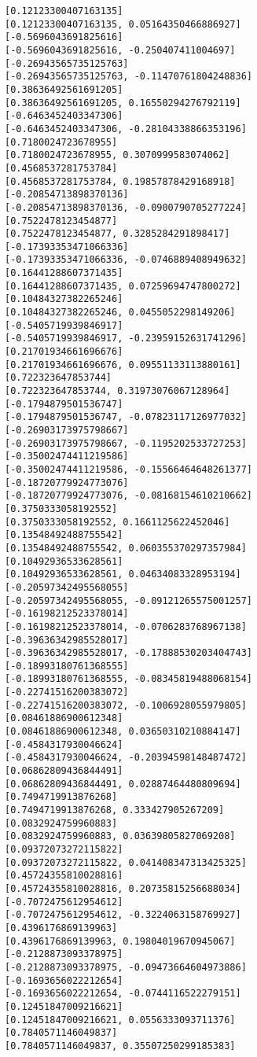 \documentclass[11pt]{article}
\begin{document}
\begin{Verbatim}[commandchars=\\\{\}]
[0.12123300407163135]
[0.12123300407163135, 0.05164350466886927]
[-0.5696043691825616]
[-0.5696043691825616, -0.250407411004697]
[-0.26943565735125763]
[-0.26943565735125763, -0.11470761804248836]
[0.38636492561691205]
[0.38636492561691205, 0.16550294276792119]
[-0.6463452403347306]
[-0.6463452403347306, -0.28104338866353196]
[0.7180024723678955]
[0.7180024723678955, 0.3070999583074062]
[0.4568537281753784]
[0.4568537281753784, 0.19857878429168918]
[-0.20854713898370136]
[-0.20854713898370136, -0.0900790705277224]
[0.7522478123454877]
[0.7522478123454877, 0.3285284291898417]
[-0.17393353471066336]
[-0.17393353471066336, -0.0746889408949632]
[0.16441288607371435]
[0.16441288607371435, 0.07259694747800272]
[0.10484327382265246]
[0.10484327382265246, 0.0455052298149206]
[-0.5405719939846917]
[-0.5405719939846917, -0.23959152631741296]
[0.21701934661696676]
[0.21701934661696676, 0.09551133113880161]
[0.722323647853744]
[0.722323647853744, 0.31973076067128964]
[-0.1794879501536747]
[-0.1794879501536747, -0.07823117126977032]
[-0.26903173975798667]
[-0.26903173975798667, -0.1195202533727253]
[-0.35002474411219586]
[-0.35002474411219586, -0.15566464648261377]
[-0.18720779924773076]
[-0.18720779924773076, -0.08168154610210662]
[0.3750333058192552]
[0.3750333058192552, 0.1661125622452046]
[0.13548492488755542]
[0.13548492488755542, 0.060355370297357984]
[0.10492936533628561]
[0.10492936533628561, 0.04634083328953194]
[-0.20597342495568055]
[-0.20597342495568055, -0.09121265575001257]
[-0.16198212523378014]
[-0.16198212523378014, -0.0706283768967138]
[-0.39636342985528017]
[-0.39636342985528017, -0.17888530203404743]
[-0.18993180761368555]
[-0.18993180761368555, -0.08345819488068154]
[-0.22741516200383072]
[-0.22741516200383072, -0.1006928055979805]
[0.08461886900612348]
[0.08461886900612348, 0.03650310210884147]
[-0.4584317930046624]
[-0.4584317930046624, -0.20394598148487472]
[0.06862809436844491]
[0.06862809436844491, 0.02887464480809694]
[0.7494719913876268]
[0.7494719913876268, 0.333427905267209]
[0.0832924759960883]
[0.0832924759960883, 0.03639805827069208]
[0.09372073272115822]
[0.09372073272115822, 0.041408347313425325]
[0.45724355810028816]
[0.45724355810028816, 0.20735815256688034]
[-0.7072475612954612]
[-0.7072475612954612, -0.3224063158769927]
[0.4396176869139963]
[0.4396176869139963, 0.19804019670945067]
[-0.2128873093378975]
[-0.2128873093378975, -0.09473664604973886]
[-0.1693656022212654]
[-0.1693656022212654, -0.0744116522279151]
[0.12451847009216621]
[0.12451847009216621, 0.0556333093711376]
[0.7840571146049837]
[0.7840571146049837, 0.35507250299185383]

\end{Verbatim}
\end{document}
